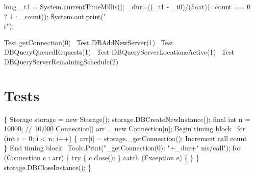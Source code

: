 \documentclass{article}
\def\nwendcode{\endtrivlist \endgroup}
\let\nwdocspar=\par
\begin{document}
\nwenddocs{}\endmoddef{}
long _t1 = System.currentTimeMillis();
_dur=((_t1 - _t0)/(float)(_count == 0 ? 1 : _count));
System.out.print("\\r");
\nwendcode{}\nwdocspar

\nwenddocs{}\endmoddef{}
\LA{}Test getConnection\edoc{}(0)~{\nwtagstyle{}}\RA{}
\LA{}Test \code{}DBAddNewServer\edoc{}(1)~{\nwtagstyle{}}\RA{}
\LA{}Test \code{}DBQueryQueuedRequests\edoc{}(1)~{\nwtagstyle{}}\RA{}
\LA{}Test \code{}DBQueryServerLocationsActive\edoc{}(1)~{\nwtagstyle{}}\RA{}
\LA{}Test \code{}DBQueryServerRemainingSchedule\edoc{}(2)~{\nwtagstyle{}}\RA{}
\nwendcode{}\nwdocspar

\section{Tests}
\label{sec:tests}

\nwenddocs{}\endmoddef{}
\{
  Storage storage = new Storage();
  storage.DBCreateNewInstance();
  final int n = 10000;  // 10,000
  Connection[] arr = new Connection[n];
  \LA{}Begin timing block~{\nwtagstyle{}}\RA{}
  for (int i = 0; i < n; i++) \{
    arr[i] = storage._getConnection();
    \LA{}Increment call count~{\nwtagstyle{}}\RA{}
  \}
  \LA{}End timing block~{\nwtagstyle{}}\RA{}
  Tools.Print("_getConnection(0): "+_dur+" ms/call");
  for (Connection c : arr) \{
    try \{
      c.close();
    \} catch (Exception e) \{ \}
  \}
  storage.DBCloseInstance();
\}
\nwendcode{}\nwdocspar
\end{document}
